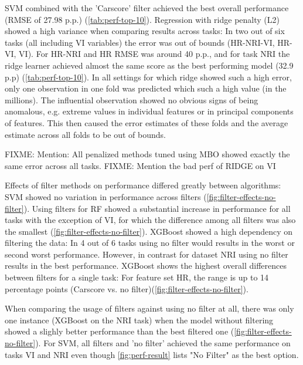 \documentclass[letterpaper, peerreview]{IEEEtran}
\begin{document}
SVM combined with the 'Carscore' filter achieved the best overall performance (RMSE of 27.98 p.p.) (\autoref{tab:perf-top-10}).
Regression with ridge penalty (L2) showed a high variance when comparing results across tasks: In two out of six tasks (all including VI variables) the error was out of bounds (HR-NRI-VI, HR-VI, VI). For HR-NRI and HR RMSE was around 40 p.p., and for task NRI the ridge learner achieved almost the same score as the best performing model (32.9 p.p) (\autoref{tab:perf-top-10}).
In all settings for which ridge showed such a high error, only one observation in one fold was predicted which such a high value (in the millions).
The influential observation showed no obvious signs of being anomalous, e.g. extreme values in individual features or in principal components of features.
This then caused the error estimates of these folds and the average estimate across all folds to be out of bounds.

FIXME: Mention: All penalized methods tuned using MBO showed exactly the same error across all tasks.
FIXME: Mention the bad perf of RIDGE on VI

Effects of filter methods on performance differed greatly between algorithms:
SVM showed no variation in performance across filters (\autoref{fig:filter-effects-no-filter}).
Using filters for RF showed a substantial increase in performance for all tasks with the exception of VI, for which the difference among all filters was also the smallest (\autoref{fig:filter-effects-no-filter}).
XGBoost showed a high dependency on filtering the data: In 4 out of 6 tasks using no filter would results in the worst or second worst performance.
However, in contrast for dataset NRI using no filter results in the best performance.
XGBoost shows the highest overall differences between filters for a single task:
For feature set HR, the range is up to 14 percentage points (Carscore vs. no filter)(\autoref{fig:filter-effects-no-filter}).

When comparing the usage of filters against using no filter at all, there was only one instance (XGBoost on the NRI task) when the model without filtering showed a slighly better performance than the best filtered one (\autoref{fig:filter-effects-no-filter}).
For SVM, all filters and 'no filter' achieved the same performance on tasks VI and NRI even though \autoref{fig:perf-result} lists "No Filter" as the best option.
\end{document}
